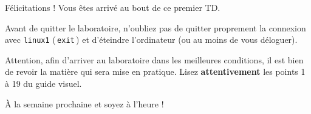 \documentclass[a4paper,11pt]{article}
\begin{document}
Félicitations ! Vous \^etes arriv\'e au bout de ce premier TD.
 \par
Avant de quitter le laboratoire, n'oubliez pas de quitter proprement la connexion avec \verb_linux1_ (\,\verb|exit|\,) et d'\'eteindre l'ordinateur (ou au moins de vous d\'eloguer).
\par
Attention, afin d'arriver au laboratoire dans les meilleures conditions, il est bien de revoir la mati\`ere qui sera mise en pratique. Lisez \textbf{attentivement}
les points 1 \`a 19 du guide visuel. 

 \par
\`A la semaine prochaine et soyez \`a l'heure !
\par
	
	
\end{document}
